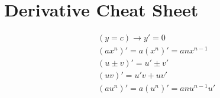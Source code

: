 \newpage
\section{Derivative Cheat Sheet}
\begin{multicols}{2}
\begin{align*}
&(y = c)\to y' = 0 \\
&(ax^n)' = a(x^n)' = anx^{n-1} \\
&(u \pm v)' = u' \pm v' \\
&(uv)' = u'v + uv' \\
&(au^n)' = a(u^n)' = anu^{n-1}u' \\
\end{align*}

\end{multicols}